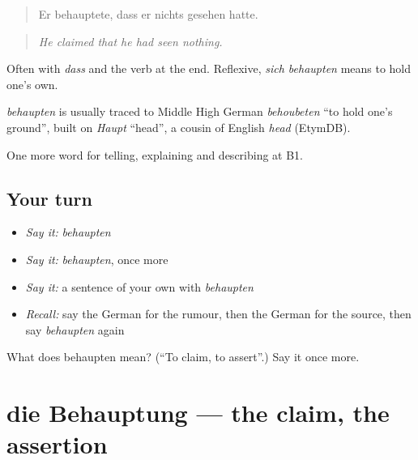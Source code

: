 \begin{quote}
Er behauptete, dass er nichts gesehen hatte.
\end{quote}

\begin{quote}
\emph{He claimed that he had seen nothing.}
\end{quote}

Often with \emph{dass} and the verb at the end. Reflexive, \emph{sich behaupten} means to hold one's own.

\begin{cousinweb}
\emph{behaupten} is usually traced to Middle High German \emph{behoubeten} \textquotedblleft{}to hold one's ground\textquotedblright{}, built on \emph{Haupt} \textquotedblleft{}head\textquotedblright{}, a cousin of English \emph{head} (EtymDB).
\end{cousinweb}

\begin{grammarlens}[title={What you've built}]
One more word for telling, explaining and describing at B1.
\end{grammarlens}

\subsection*{Your turn}
\begin{itemize}
\raggedright
  \item \emph{Say it:} \emph{behaupten}
  \item \emph{Say it:} \emph{behaupten}, once more
  \item \emph{Say it:} a sentence of your own with \emph{behaupten}
  \item \emph{Recall:} say the German for the rumour, then the German for the source, then say \emph{behaupten} again
\end{itemize}

\begin{tcolorbox}[breakable,colback=teal!4,colframe=teal!35!black,title={Before you move on}]
What does behaupten mean? (\textquotedblleft{}To claim, to assert\textquotedblright{}.) Say it once more.
\end{tcolorbox}
\section[die Behauptung]{die Behauptung — the claim, the assertion}

\label{lesson:GE-C274-behauptung}



